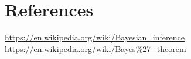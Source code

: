 \documentclass[11pt]{article}
\begin{document}
\section{References}
\href{https://en.wikipedia.org/wiki/Bayesian\_inference}{https://en.wikipedia.org/wiki/Bayesian\_inference}\\
\href{hrefhttps://en.wikipedia.org/wiki/Bayes\%27\_theorem}{https://en.wikipedia.org/wiki/Bayes\%27\_theorem}\\

\citet{Croom04}



\end{document}
